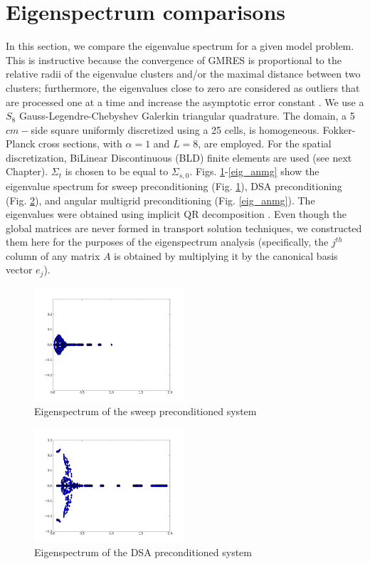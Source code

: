 \section{Eigenspectrum comparisons}
In this section, we compare the eigenvalue spectrum for a given model problem.
This is instructive because the convergence of GMRES is proportional to the
relative radii of the eigenvalue clusters and/or the maximal distance between
two clusters; furthermore, the eigenvalues close to zero are considered as
outliers that are processed one at a time and increase the asymptotic error
constant \cite{campbell}.  We use a $S_8$ Gauss-Legendre-Chebyshev Galerkin
triangular quadrature. The domain, a 5$cm-$side square uniformly discretized
using a 25 cells, is homogeneous. Fokker-Planck cross sections, with
$\alpha=1$ and $L=8$, are employed. For the spatial discretization, BiLinear
Discontinuous (BLD) finite elements are used (see next Chapter). $\Sigma_t$ 
is chosen to be equal to $\Sigma_{s,0}$. Figs. \ref{eig_sweep}-\ref{eig_anmg} 
show the eigenvalue spectrum for sweep preconditioning (Fig. \ref{eig_sweep}), 
DSA preconditioning (Fig. \ref{eig_dsa}), and angular multigrid preconditioning
(Fig. \ref{eig_anmg}). The eigenvalues were obtained using implicit QR
decomposition \cite{implicitQR}. Even though the global matrices are never
formed in transport solution techniques, we constructed them here for the
purposes of the eigenspectrum analysis (specifically, the $j^{th}$ column of
any matrix $A$ is obtained by multiplying it by the canonical basis vector
$e_j$).
\begin{figure}[H]
  \centering
  \includegraphics[width=0.5\textwidth]{./Anmg/s8_5_5}
  \caption{Eigenspectrum of the sweep preconditioned system}
  \label{eig_sweep}
\end{figure}
\begin{figure}[H]
  \centering
  \includegraphics[width=0.5\textwidth]{./Anmg/d_s8_5_5}
  \caption{Eigenspectrum of the DSA preconditioned system}
  \label{eig_dsa}
\end{figure}
